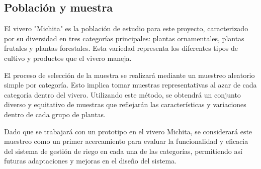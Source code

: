 
\subsection{Población y muestra}

El vivero "Michita" es la población de estudio para este proyecto, caracterizado por su diversidad en tres categorías principales: plantas ornamentales, plantas frutales y plantas forestales. Esta variedad representa los diferentes tipos de cultivo y productos que el vivero maneja.

\bigbreak
El proceso de selección de la muestra se realizará mediante un muestreo aleatorio simple por categoría. Esto implica tomar muestras representativas al azar de cada categoría dentro del vivero. Utilizando este método, se obtendrá un conjunto diverso y equitativo de muestras que reflejarán las características y variaciones dentro de cada grupo de plantas.

\bigbreak
Dado que se trabajará con un prototipo en el vivero Michita, se considerará este muestreo como un primer acercamiento para evaluar la funcionalidad y eficacia del sistema de gestión de riego en cada una de las categorías, permitiendo así futuras adaptaciones y mejoras en el diseño del sistema.